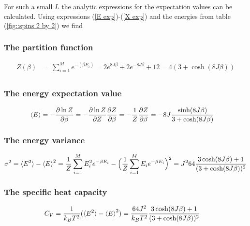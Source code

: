 \documentclass[11pt]{article}
\begin{document}
\begin{flushleft}
For such a small $L$ the analytic expressions for the expectation values can be calculated. Using expressions (\ref{E exp})-(\ref{X exp}) and the energies from table (\ref{fig::spins 2 by 2}) we find

\subsubsection*{The partition function}

\begin{align*}
Z(\beta) &= \sum_{i=1}^M e^{-(\beta E_i)}
= 2 e^{8J \beta} + 2 e^{-8J \beta} + 12
= 4(3 + \cosh (8 J \beta))\\
\end{align*}


\subsubsection*{The energy expectation value}

\begin{align*}
\braket{E} & = - \frac{\partial \ln Z}{\partial \beta}= - \frac{\partial \ln Z}{\partial Z} \frac{\partial Z}{\partial \beta} = - \frac{1}{Z} \frac{\partial Z}{\partial \beta}
= - 8J \frac{\sinh(8J \beta)}{3 + \cosh(8J \beta)}  
\end{align*}

\subsubsection*{The energy variance}

\begin{align*}
\sigma^2 &= \braket{E^2} - \braket{E}^2 = \frac{1}{Z} \sum_{i=1}^M E_i^2 e^{- \beta E_i} - \Big(
\frac{1}{Z} \sum_{i=1}^M E_i e^{- \beta E_i} 
\Big)^2 = J^264 \frac{
3\cosh (8J \beta) + 1}{ (3 + \cosh (8 J \beta))^2}\\
\end{align*}

\subsubsection*{The specific heat capacity} 

\begin{align*}
C_V &= \frac{1}{k_B T^2} (\braket{E^2} - \braket{E}^2) = \frac{64J^2}{k_B T^2}
\frac{3\cosh (8J \beta) + 1}{ (3 + \cosh (8 J \beta))^2}
\end{align*}



\end{flushleft}
\end{document}
